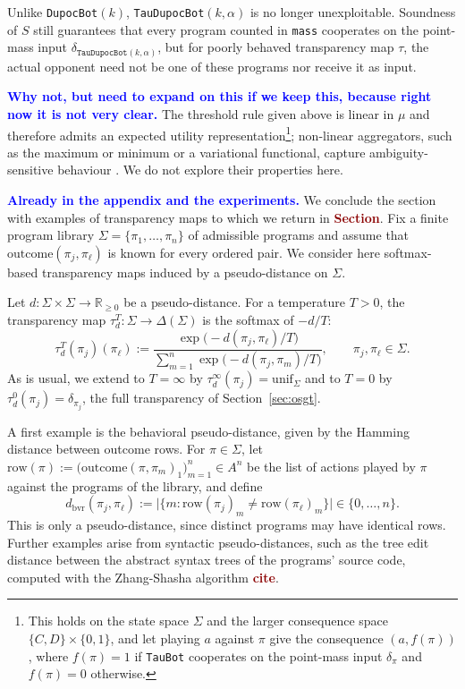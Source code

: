 \documentclass[twoside,11pt]{article}
\newcommand{\boldred}[1]{\textbf{\textcolor{darkred}{#1}}}
\newcommand{\boldblue}[1]{\textbf{\textcolor{blue}{#1}}}
\begin{document}
Unlike \texttt{DupocBot}$(k)$, \texttt{TauDupocBot}$(k, \alpha)$ is no longer unexploitable. Soundness of $S$ still guarantees that every program counted in \texttt{mass} cooperates on the point-mass input $\delta_{\texttt{TauDupocBot}(k,\alpha)}$, but for poorly behaved transparency map $\tau$, the actual opponent need not be one of these programs nor receive it as input.

\boldblue{Why not, but need to expand on this if we keep this, because right now it is not very clear.}
The threshold rule given above is linear in $\mu$ and therefore admits an expected utility representation\footnote{This holds on the state space $\Sigma$ and the larger consequence space $\{C,D\} \times \{0,1\}$, and let playing $a$ against $\pi$ give the consequence $(a, f(\pi))$, where $f(\pi) = 1$ if \texttt{TauBot} cooperates on the point-mass input $\delta_\pi$ and $f(\pi) = 0$ otherwise.}; non-linear aggregators, such as the maximum or minimum or a variational functional, capture ambiguity-sensitive behaviour \citep{gilboa2016ambiguity}. We do not explore their properties here.

\boldblue{Already in the appendix and the experiments.}
We conclude the section with examples of transparency maps to which we return in \boldred{Section}. Fix a finite program library $\Sigma = \{\pi_1, \ldots, \pi_n\}$ of admissible programs and assume that $\mathrm{outcome}(\pi_j,\pi_\ell)$ is known for every ordered pair. We consider here softmax-based transparency maps induced by a pseudo-distance on $\Sigma$.

\begin{definition}\label{def:tau-softmax-Family}
Let $d : \Sigma \times \Sigma \to \mathbb{R}_{\ge 0}$ be a pseudo-distance. For a temperature $T > 0$, the transparency map $\tau^{T}_{d}\colon \Sigma \to \Delta(\Sigma)$ is the softmax of $-d/T$:
\[
  \tau^{T}_{d}(\pi_j)(\pi_\ell)
  := \frac{\exp\bigl(-d(\pi_j,\pi_\ell)/T\bigr)}
          {\sum_{m=1}^{n} \exp\bigl(-d(\pi_j,\pi_m)/T\bigr)},
  \qquad \pi_j, \pi_\ell \in \Sigma.
\]
As is usual, we extend to $T = \infty$ by $\tau^{\infty}_{d}(\pi_j) = \mathrm{unif}_{\Sigma}$ and to $T= 0$ by $\tau^{0}_{d}(\pi_j) = \delta_{\pi_j}$, the full transparency of Section~\ref{sec:osgt}.
\end{definition}

A first example is the behavioral pseudo-distance, given by the Hamming distance between outcome rows. For $\pi \in \Sigma$, let $\mathrm{row}(\pi) := \bigl(\mathrm{outcome}(\pi, \pi_m)_1\bigr)_{m=1}^{n} \in A^n$ be the list of actions played by $\pi$ against the programs of the library, and define
\[
  d_{\mathrm{bvr}}(\pi_j, \pi_\ell) := \bigl|\{ m : \mathrm{row}(\pi_j)_m \neq \mathrm{row}(\pi_\ell)_m \}\bigr| \in \{0, \ldots, n\}.
\]
This is only a pseudo-distance, since distinct programs may have identical rows. Further examples arise from syntactic pseudo-distances, such as the tree edit distance between the abstract syntax trees of the programs' source code, computed with the Zhang-Shasha algorithm \boldred{cite}.
\end{document}
